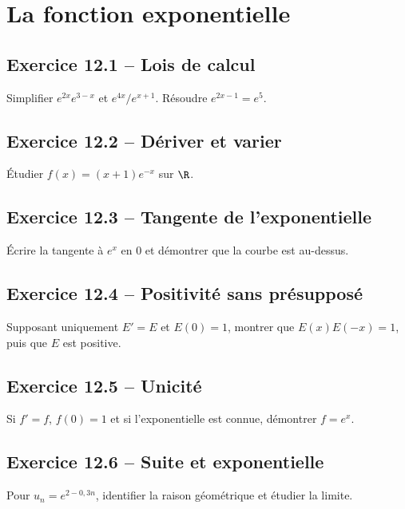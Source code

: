 \chapter{La fonction exponentielle}
\section*{Exercice 12.1 -- Lois de calcul}
Simplifier $e^{2x}e^{3-x}$ et $e^{4x}/e^{x+1}$. Résoudre $e^{2x-1}=e^5$.

\section*{Exercice 12.2 -- Dériver et varier}
Étudier $f(x)=(x+1)e^{-x}$ sur $\R$.

\section*{Exercice 12.3 -- Tangente de l'exponentielle}
Écrire la tangente à $e^x$ en $0$ et démontrer que la courbe est au-dessus.

\section*{Exercice 12.4 -- Positivité sans présupposé}
Supposant uniquement $E'=E$ et $E(0)=1$, montrer que $E(x)E(-x)=1$, puis que $E$ est positive.

\section*{Exercice 12.5 -- Unicité}
Si $f'=f$, $f(0)=1$ et si l'exponentielle est connue, démontrer $f=e^x$.

\section*{Exercice 12.6 -- Suite et exponentielle}
Pour $u_n=e^{2-0{,}3n}$, identifier la raison géométrique et étudier la limite.
